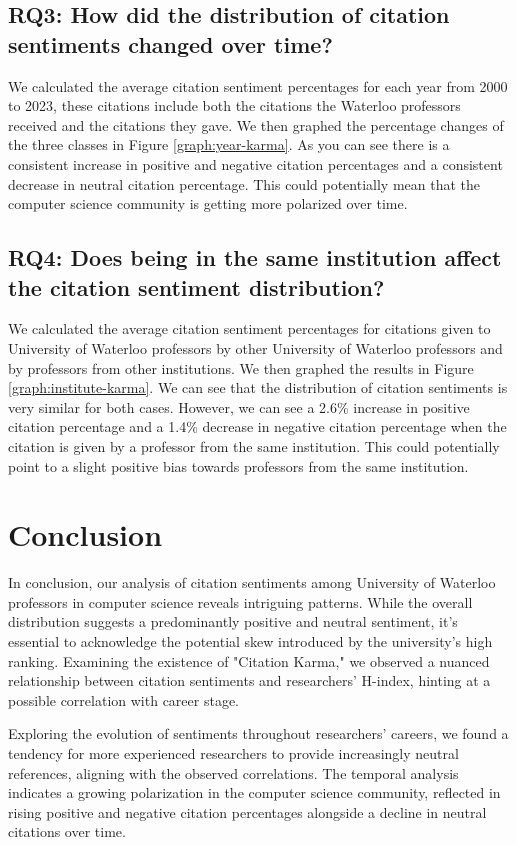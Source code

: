 \documentclass[sigconf]{acmart}
\begin{document}
\subsection{RQ3: How did the distribution of citation sentiments changed over time?}
We calculated the average citation sentiment percentages for each year from 2000 to 2023, these citations include both the citations the Waterloo professors received and the citations they gave. We then graphed the percentage changes of the three classes in Figure \ref{graph:year-karma}. As you can see there is a consistent increase in positive and negative citation percentages and a consistent decrease in neutral citation percentage. This could potentially mean that the computer science community is getting more polarized over time.

\subsection{RQ4: Does being in the same institution affect the citation sentiment distribution?} 
We calculated the average citation sentiment percentages for citations given to University of Waterloo professors by other University of Waterloo professors and by professors from other institutions. We then graphed the results in Figure \ref{graph:institute-karma}. We can see that the distribution of citation sentiments is very similar for both cases. However, we can see a 2.6\% increase in positive citation percentage and a 1.4\% decrease in negative citation percentage when the citation is given by a professor from the same institution. This could potentially point to a slight positive bias towards professors from the same institution.

\section{Conclusion}
In conclusion, our analysis of citation sentiments among University of Waterloo professors in computer science reveals intriguing patterns. While the overall distribution suggests a predominantly positive and neutral sentiment, it's essential to acknowledge the potential skew introduced by the university's high ranking. Examining the existence of "Citation Karma," we observed a nuanced relationship between citation sentiments and researchers' H-index, hinting at a possible correlation with career stage.

Exploring the evolution of sentiments throughout researchers' careers, we found a tendency for more experienced researchers to provide increasingly neutral references, aligning with the observed correlations. The temporal analysis indicates a growing polarization in the computer science community, reflected in rising positive and negative citation percentages alongside a decline in neutral citations over time.
\end{document}
